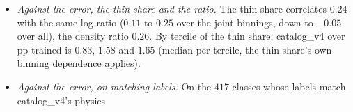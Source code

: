 \documentclass[11pt]{article}
\begin{document}
\begin{itemize}
    On every class without $b$, mismatched labels included:
    catalog\_v4's MSE over the pp-trained arm's: $0.30$ ($95\%$ bootstrap interval $0.23$ to $0.38$); with the
    optimizer's factor removed (catalog\_v4 over catalog\_v3 with Muon, less pp-trained over catalog\_v3 with AdamW)
    $0.32$. Over the joint binnings $0.27$ to $0.32$; with $\sqrt{\hat s}$ alone $-0.01$, and per variable alone
    $-0.01$ ($\sqrt{\hat s}$), $0.15$ (angle), $0.19$ (collinear), $0.26$ (smallest $p_T$). The control, catalog\_v3's
    KL against what pp training gains over it on its $617$ training classes, reads $0.59$.
  \item \emph{Against the error, the thin share and the ratio.} The thin share correlates $0.24$ with the same log
    ratio ($0.11$ to $0.25$ over the joint binnings, down to $-0.05$ over all), the density ratio $0.26$. By tercile of
    the thin share, catalog\_v4 over pp-trained is $0.83$, $1.58$ and $1.65$ (median per tercile, the thin share's own
    binning dependence applies).
  \item \emph{Against the error, on matching labels.} On the $417$ classes whose labels match catalog\_v4's physics

\end{itemize}
\end{document}
